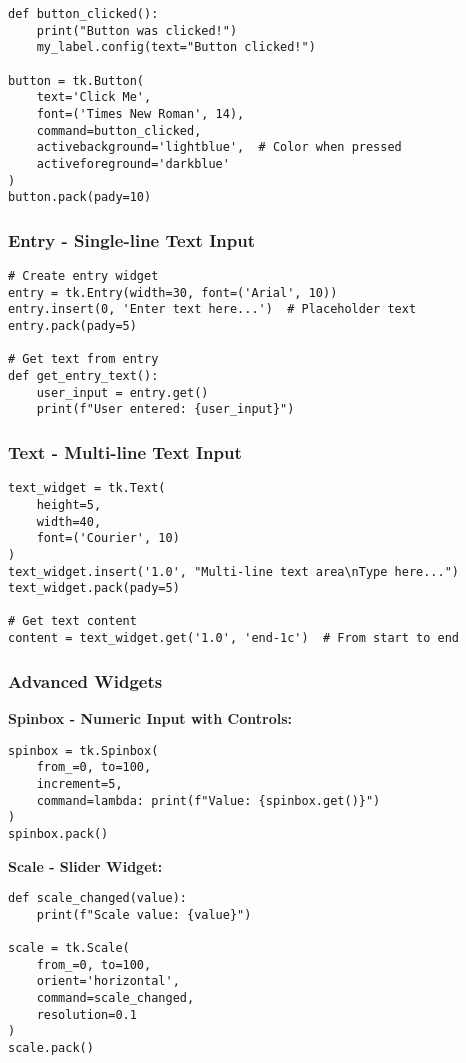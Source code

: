 \documentclass[12pt,a4paper]{article}
\begin{document}
\begin{lstlisting}
def button_clicked():
    print("Button was clicked!")
    my_label.config(text="Button clicked!")

button = tk.Button(
    text='Click Me',
    font=('Times New Roman', 14),
    command=button_clicked,
    activebackground='lightblue',  # Color when pressed
    activeforeground='darkblue'
)
button.pack(pady=10)
\end{lstlisting}

\subsubsection{Entry - Single-line Text Input}

\begin{lstlisting}
# Create entry widget
entry = tk.Entry(width=30, font=('Arial', 10))
entry.insert(0, 'Enter text here...')  # Placeholder text
entry.pack(pady=5)

# Get text from entry
def get_entry_text():
    user_input = entry.get()
    print(f"User entered: {user_input}")
\end{lstlisting}

\subsubsection{Text - Multi-line Text Input}

\begin{lstlisting}
text_widget = tk.Text(
    height=5,
    width=40,
    font=('Courier', 10)
)
text_widget.insert('1.0', "Multi-line text area\nType here...")
text_widget.pack(pady=5)

# Get text content
content = text_widget.get('1.0', 'end-1c')  # From start to end
\end{lstlisting}

\subsubsection{Advanced Widgets}

\textbf{Spinbox - Numeric Input with Controls:}
\begin{lstlisting}
spinbox = tk.Spinbox(
    from_=0, to=100,
    increment=5,
    command=lambda: print(f"Value: {spinbox.get()}")
)
spinbox.pack()
\end{lstlisting}

\textbf{Scale - Slider Widget:}
\begin{lstlisting}
def scale_changed(value):
    print(f"Scale value: {value}")

scale = tk.Scale(
    from_=0, to=100,
    orient='horizontal',
    command=scale_changed,
    resolution=0.1
)
scale.pack()
\end{lstlisting}
\end{document}
